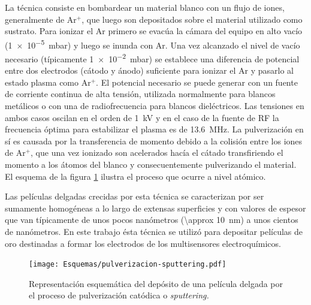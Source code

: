 		La técnica consiste en bombardear un material blanco con un flujo de iones, generalmente de Ar$^+$, que luego son depositados sobre el material utilizado como sustrato. Para ionizar el Ar primero se evacúa la cámara del equipo en alto vacío (\SI{1e-5}{\milli\bar}) y luego se inunda con Ar. Una vez alcanzado el nivel de vacío necesario (típicamente \SI{1e-2}{\milli\bar}) se establece una diferencia de potencial entre dos electrodos (cátodo y ánodo) suficiente para ionizar el Ar y pasarlo al estado plasma como Ar$^{+}$. El potencial necesario se puede generar con un fuente de corriente continua de alta tensión, utilizada normalmente para blancos metálicos o con una de radiofrecuencia para blancos dieléctricos. Las tensiones en ambos casos oscilan en el orden de \SI{1}{\kilo\volt} y en el caso de la fuente de RF la frecuencia óptima para estabilizar el plasma es de \SI{13.6}{\mega\hertz}. La pulverización en sí es causada por la transferencia de momento debido a la colisión entre los iones de Ar$^+$, que una vez ionizado son acelerados hacía el cátado transfiriendo el momento a los átomos del blanco y consecuentemente pulverizando el material. El esquema de la figura \ref{fig:sssspputt} ilustra el proceso que ocurre a nivel atómico. \cite{Behrisch1981,sigmund1968,Bhatt2007}
	
		Las películas delgadas crecidas por esta técnica se caracterizan por ser sumamente homogéneas a lo largo de extensas superficies y con valores de espesor que van típicamente de unos pocos nanómetros (\SI{\approx 10}{\nm}) a unos cientos de nanómetros. En este trabajo ésta técnica se utilizó para depositar películas de oro destinadas a formar los electrodos de los multisensores electroquímicos.

				\begin{figure}[h!]
 				\begin{center}
 				\texttt{[image: Esquemas/pulverizacion-sputtering.pdf]}
 				\caption[Etapas del proceso de pulverización catódica]{Representación esquemática del depósito de una película delgada por el proceso de pulverización catódica o \textit{sputtering.}}
 		   		\label{fig:sssspputt}
 		    	\end{center}
 		    	\end{figure}			

